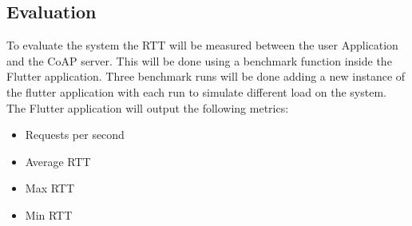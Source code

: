 \subsection{Evaluation}
To evaluate the system the RTT will be measured between the user Application and the CoAP server. This will be done using a benchmark function inside the Flutter application. Three benchmark runs will be done adding a new instance of the flutter application with each run to simulate different load on the system. The Flutter application will output the following metrics:
\begin{itemize}
    \item Requests per second
    \item Average RTT
    \item Max RTT
    \item Min RTT
\end{itemize}




